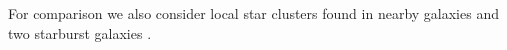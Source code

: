 \documentclass[twocolumn]{aastex61}
\begin{document}
For comparison we also consider local star clusters found in nearby galaxies 
\citep{adamo13} and two starburst galaxies \citep{bastian06,larsen02}. 


%
\end{document}
